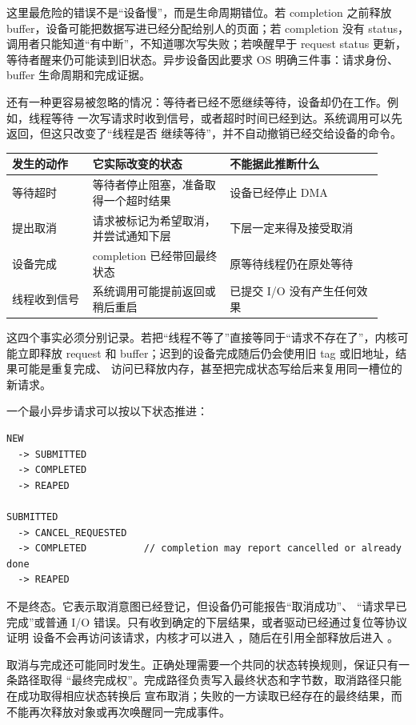 这里最危险的错误不是“设备慢”，而是生命周期错位。若 completion 之前释放 buffer，设备可能把数据写进已经分配给别人的页面；若 completion 没有 status，调用者只能知道“有中断”，不知道哪次写失败；若唤醒早于 request status 更新，等待者醒来仍可能读到旧状态。异步设备因此要求 OS 明确三件事：请求身份、buffer 生命周期和完成证据。

还有一种更容易被忽略的情况：等待者已经不愿继续等待，设备却仍在工作。例如，线程等待
一次写请求时收到信号，或者超时时间已经到达。系统调用可以先返回，但这只改变了“线程是否
继续等待”，并不自动撤销已经交给设备的命令。

\begin{longtable}{|L{0.2\linewidth}|L{0.34\linewidth}|L{0.38\linewidth}|}
\toprule
发生的动作 & 它实际改变的状态 & 不能据此推断什么 \\
\midrule
等待超时 & 等待者停止阻塞，准备取得一个超时结果 & 设备已经停止 DMA \\\tablerowrule
提出取消 & 请求被标记为希望取消，并尝试通知下层 & 下层一定来得及接受取消 \\\tablerowrule
设备完成 & completion 已经带回最终状态 & 原等待线程仍在原处等待 \\\tablerowrule
线程收到信号 & 系统调用可能提前返回或稍后重启 & 已提交 I/O 没有产生任何效果 \\
\bottomrule
\end{longtable}

这四个事实必须分别记录。若把“线程不等了”直接等同于“请求不存在了”，内核可能立即释放
request 和 buffer；迟到的设备完成随后仍会使用旧 tag 或旧地址，结果可能是重复完成、
访问已释放内存，甚至把完成状态写给后来复用同一槽位的新请求。

一个最小异步请求可以按以下状态推进：

\begin{lstlisting}
NEW
  -> SUBMITTED
  -> COMPLETED
  -> REAPED

SUBMITTED
  -> CANCEL_REQUESTED
  -> COMPLETED          // completion may report cancelled or already done
  -> REAPED
\end{lstlisting}

 不是终态。它表示取消意图已经登记，但设备仍可能报告“取消成功”、
“请求早已完成”或普通 I/O 错误。只有收到确定的下层结果，或者驱动已经通过复位等协议证明
设备不会再访问该请求，内核才可以进入 ，随后在引用全部释放后进入
。

取消与完成还可能同时发生。正确处理需要一个共同的状态转换规则，保证只有一条路径取得
“最终完成权”。完成路径负责写入最终状态和字节数，取消路径只能在成功取得相应状态转换后
宣布取消；失败的一方读取已经存在的最终结果，而不能再次释放对象或再次唤醒同一完成事件。

